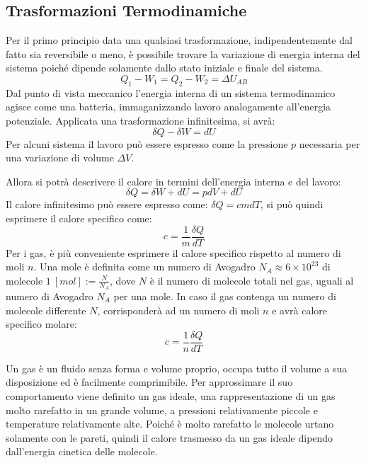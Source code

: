 \documentclass{article}
\numberwithin{equation}{subsection}
\begin{document}
\subsection{Trasformazioni Termodinamiche}
Per il primo principio data una qualsiasi trasformazione, 
indipendentemente dal fatto sia reversibile o meno, è 
possibile trovare la variazione di energia interna del 
sistema
poiché dipende solamente dallo stato iniziale e finale del sistema. 
\begin{equation*}
    Q_1-W_1=Q_2-W_2=\Delta U_{AB}
\end{equation*}
Dal punto di vista meccanico l'energia interna di un 
sistema termodinamico agisce 
come una batteria, immaganizzando lavoro analogamente all'energia potenziale. 
Applicata una trasformazione infinitesima, si avrà:
\begin{equation*}
    \delta Q-\delta W=dU
\end{equation*}
Per alcuni sistema il lavoro può essere espresso come la 
pressione $p$ necessaria per una variazione di volume $\Delta V$. 



Allora si potrà descrivere il calore in termini dell'energia 
interna e del lavoro:
\begin{equation*}
    \delta Q=\delta W+dU=pdV+dU
\end{equation*}
Il calore infinitesimo può essere espresso come: $\delta Q=cmdT$, 
si può quindi esprimere il calore specifico come:
\begin{equation*}
    c=\displaystyle\frac{1}{m}\frac{\delta Q}{dT}
\end{equation*}
Per i gas, è più conveniente esprimere il calore specifico 
rispetto al numero di moli $n$. Una mole è definita come un numero 
di Avogadro $N_A\approx 6\times10^{23}$ di molecole $1\:[mol]:=\displaystyle\frac{N}{N_A}$, 
dove $N$ è il numero di molecole totali nel gas, uguali al numero di Avogadro $N_A$ per una mole. In caso il gas contenga un numero di molecole 
differente $N$, corrisponderà ad un numero di moli $n$ e avrà calore specifico molare:
\begin{equation*}
    c=\displaystyle\frac{1}{n}\frac{\delta Q}{dT}
\end{equation*}



Un gas è un fluido senza forma e volume proprio, occupa tutto il volume a sua disposizione ed è facilmente comprimibile. 
Per approssimare il suo comportamento viene definito 
un gas ideale, una rappresentazione di un gas molto 
rarefatto in un grande volume, a pressioni relativamente piccole 
e temperature relativamente alte. Poiché è molto rarefatto le 
molecole urtano solamente con le pareti, quindi il calore 
trasmesso da un gas ideale dipendo dall'energia cinetica delle 
molecole. 
\end{document}
